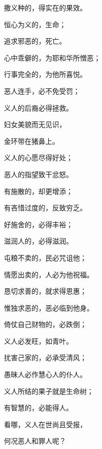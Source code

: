 {\par }{\Q 撒义种的，得实在的果效。
\par }{\Q {}恒心为义的，{}生命；
\par }{\Q 追求邪恶的，{}死亡。
\par }{\Q {}心中乖僻的，为耶和华所憎恶；
\par }{\Q 行事完全的，为他所喜悦。
\par }{\Q {}恶人{}连手，必不免受罚；
\par }{\Q 义人的后裔必得拯救。
\par }{\Q {}妇女美貌而无见识，
\par }{金环带在猪鼻上。
\par }{\Q {}义人的心愿尽得好处；
\par }{\Q 恶人的指望致干忿怒。
\par }{\Q {}有施散的，却更增添；
\par }{\Q 有吝惜过度的，反致穷乏。
\par }{\Q {}好施舍的，必得丰裕；
\par }{\Q 滋润人的，必得滋润。
\par }{\Q {}屯粮不卖的，民必咒诅他；
\par }{\Q 情愿出卖的，人必为他祝福。
\par }{\Q {}恳切求善的，就求得恩惠；
\par }{\Q 惟独求恶的，恶必临到他身。
\par }{\Q {}倚仗自己财物的，必跌倒；
\par }{\Q 义人必发旺，如青叶。
\par }{\Q {}扰害己家的，必承受清风；
\par }{\Q 愚昧人必作慧心人的仆人。
\par }{\Q {}义人所结的果子就是生命树；
\par }{\Q 有智慧的，必能得人。
\par }{\Q {}看哪，义人在世尚且受报，
\par }{\Q 何况恶人和罪人呢？

}
